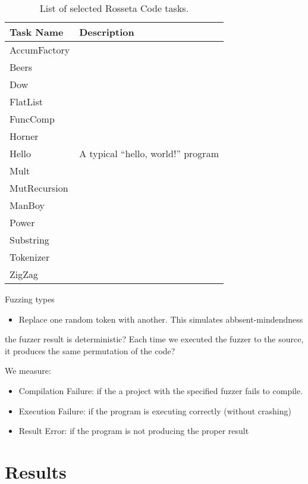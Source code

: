 \documentclass[10pt]{sigplanconf}
\begin{document}
\begin{table}
\begin{center}
\caption{List of selected Rosseta Code tasks.}
\label{tab:Tasks}
\begin{tabular}{ l p{4cm}}
 \hline
Task Name & Description\\
\hline
AccumFactory & \\
Beers & \\
Dow & \\
FlatList & \\
FuncComp & \\
Horner & \\
Hello & A typical ``hello, world!'' program\\
Mult & \\
MutRecursion & \\
ManBoy & \\
Power & \\
Substring & \\
Tokenizer & \\
ZigZag & \\
\hline
\end{tabular}
\end{center}
\end{table}


Fuzzing types
\begin{itemize}
\item Replace one random token with another.
This simulates abbsent-mindendness 
\end{itemize}

the fuzzer result is deterministic? Each time we executed the fuzzer to the source, it produces the same permutation of the code?

We measure:

\begin{itemize}
	\item Compilation Failure: if the a project with the specified fuzzer fails to compile.
	\item Execution Failure: if the program is executing correctly (without crashing)
	\item Result Error: if the program is not producing the proper result
\end{itemize}

\section{Results} %
\end{document}
